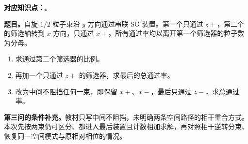 \textbf{对应知识点：}。

\textbf{题目。}自旋 $1/2$ 粒子束沿 $y$ 方向通过串联 SG 装置。第一个只通过 $z+$，第二个的筛选轴转到 $x$ 方向，只通过 $x+$。所有通过率均以离开第一个筛选器的粒子数为分母。
\begin{enumerate}
  \item 求通过第二个筛选器的比例。
  \item 再加一个只通过 $z+$ 的筛选器，求最后的总通过率。
  \item 改为中间不阻挡任何一束，即保留 $x+$、$x-$，最后只通过 $z-$，求总通过率。
\end{enumerate}
\textbf{第三问的条件补充。}教材只写中间不阻挡，未明确两条空间路径的相干重合方式。本次先按两束仍可区分、都进入最后装置且计数相加求解，再对照相干逆转分束、恢复同一空间模式与原相对相位的情况。

